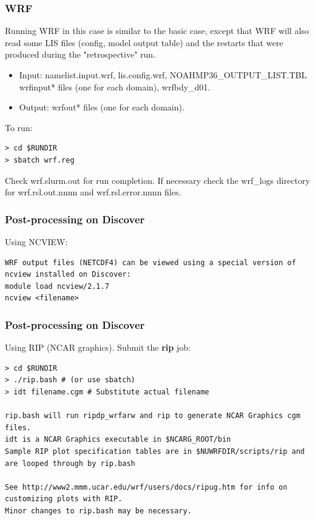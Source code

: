 \begin{frame}[fragile]\frametitle{WRF}

\footnotesize{
\hrulefill\par       
Running WRF in this case is similar to the basic case, except that WRF will also read some LIS files (config, model output table) and the restarts that were produced during the "retrospective" run.\\
\begin{itemize}
\item Input: namelist.input.wrf, lis.config.wrf, NOAHMP36\_OUTPUT\_LIST.TBL wrfinput* files (one for each domain), wrfbdy\_d01.
\item Output: wrfout* files (one for each domain).
\end{itemize}
}    
\hrulefill\par
\footnotesize{To run:}
\begin{lstlisting}
> cd $RUNDIR
> sbatch wrf.reg
\end{lstlisting}
Check wrf.slurm.out for run completion.
If necessary check the wrf\_logs directory for wrf.rsl.out.nnnn and wrf.rsl.error.nnnn files.


\end{frame}

\begin{frame}[fragile]
\frametitle{Post-processing on Discover}

Using NCVIEW:

\begin{lstlisting}
WRF output files (NETCDF4) can be viewed using a special version of ncview installed on Discover:
module load ncview/2.1.7
ncview <filename>
\end{lstlisting}

\end{frame}

\begin{frame}[fragile]
\frametitle{Post-processing on Discover}

Using RIP (NCAR graphics). Submit the \textbf{rip} job:
\begin{lstlisting}
> cd $RUNDIR
> ./rip.bash # (or use sbatch)
> idt filename.cgm # Substitute actual filename

rip.bash will run ripdp_wrfarw and rip to generate NCAR Graphics cgm files.
idt is a NCAR Graphics executable in $NCARG_ROOT/bin
Sample RIP plot specification tables are in $NUWRFDIR/scripts/rip and are looped through by rip.bash

See http://www2.mmm.ucar.edu/wrf/users/docs/ripug.htm for info on customizing plots with RIP. 
Minor changes to rip.bash may be necessary.
\end{lstlisting}

\end{frame}


